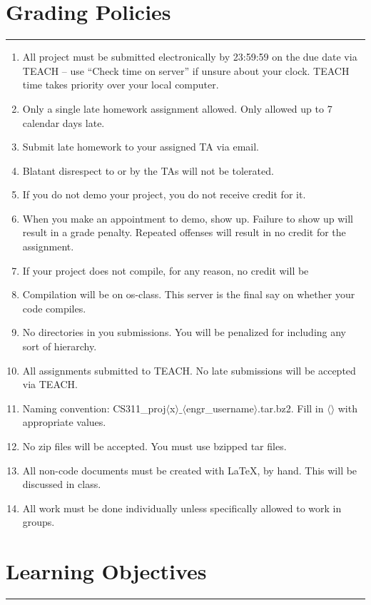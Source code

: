 \documentclass[letterpaper,10pt,titlepage]{article}
\numberwithin{equation}{section}
\begin{document}
\newpage

\section*{Grading Policies}
\hrule

\begin{enumerate}
    \item All project must be submitted electronically by 23:59:59 on the due
          date via TEACH -- use ``Check time on server'' if unsure about
          your clock. TEACH time takes priority over your local
          computer.
    \item Only a single late homework assignment allowed. Only allowed up to 7 calendar days late.
    \item Submit late homework to your assigned TA via email.
    \item Blatant disrespect to or by the TAs will not be tolerated.
    \item If you do not demo your project, you do not receive credit for it.
    \item When you make an appointment to demo, show up. Failure to show up
          will result in a grade penalty.  Repeated offenses will result in no credit for
          the assignment.
    \item If your project does not compile, for any reason, no credit will be
    \item Compilation will be on os-class. This server is the final say on whether your code compiles.
    \item No directories in you submissions. You will be penalized for
          including any sort of hierarchy.
    \item All assignments submitted to TEACH. No late submissions will be accepted via TEACH.
    \item Naming convention:
          CS311\_proj$\langle$x$\rangle\_\langle$engr\_username$\rangle$.tar.bz2.
          Fill in $\langle\rangle$ with appropriate values.
    \item No zip files will be accepted. You must use bzipped tar files.
    \item All non-code documents must be created with LaTeX, by hand. This
          will be discussed in class.
    \item All work must be done individually unless specifically allowed to work in groups.
\end{enumerate}

\section*{Learning Objectives}
\hrule
\end{document}
